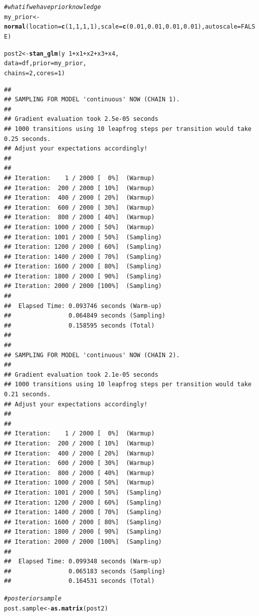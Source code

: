\documentclass[11pt,a4paper,twoside]{book}
\makeatletter
\newcommand{\hlnum}[1]{\textcolor[rgb]{0.686,0.059,0.569}{#1}}%
\newcommand{\hlcom}[1]{\textcolor[rgb]{0.678,0.584,0.686}{\textit{#1}}}%
\newcommand{\hlopt}[1]{\textcolor[rgb]{0,0,0}{#1}}%
\newcommand{\hlstd}[1]{\textcolor[rgb]{0.345,0.345,0.345}{#1}}%
\newcommand{\hlkwb}[1]{\textcolor[rgb]{0.69,0.353,0.396}{#1}}%
\newcommand{\hlkwc}[1]{\textcolor[rgb]{0.333,0.667,0.333}{#1}}%
\newcommand{\hlkwd}[1]{\textcolor[rgb]{0.737,0.353,0.396}{\textbf{#1}}}%
\newenvironment{kframe}{%
 \def\at@end@of@kframe{}%
 \ifinner\ifhmode%
  \def\at@end@of@kframe{\end{minipage}}%
  \begin{minipage}{\columnwidth}%
 \fi\fi%
 \def\FrameCommand##1{\hskip\@totalleftmargin \hskip-\fboxsep
 \colorbox{shadecolor}{##1}\hskip-\fboxsep
     \hskip-\linewidth \hskip-\@totalleftmargin \hskip\columnwidth}%
 \MakeFramed {\advance\hsize-\width
   \@totalleftmargin\z@ \linewidth\hsize
   \@setminipage}}%
 {\par\unskip\endMakeFramed%
 \at@end@of@kframe}
\newenvironment{knitrout}{}{} %
\makeatother
\begin{document}
\begin{knitrout}
\begin{kframe}
\begin{alltt}
\hlcom{#what if we have prior knowledge}
\hlstd{my_prior} \hlkwb{<-} \hlkwd{normal}\hlstd{(}\hlkwc{location} \hlstd{=} \hlkwd{c}\hlstd{(}\hlnum{1}\hlstd{,} \hlnum{1}\hlstd{,}\hlnum{1}\hlstd{,}\hlnum{1}\hlstd{),} \hlkwc{scale} \hlstd{=} \hlkwd{c}\hlstd{(}\hlnum{0.01}\hlstd{,} \hlnum{0.01}\hlstd{,}\hlnum{0.01}\hlstd{,}\hlnum{0.01}\hlstd{),} \hlkwc{autoscale} \hlstd{=} \hlnum{FALSE}\hlstd{)}

\hlstd{post2} \hlkwb{<-} \hlkwd{stan_glm}\hlstd{(y} \hlopt{~} \hlnum{1} \hlopt{+} \hlstd{x1} \hlopt{+} \hlstd{x2} \hlopt{+} \hlstd{x3} \hlopt{+} \hlstd{x4,}
                  \hlkwc{data} \hlstd{= df,} \hlkwc{prior} \hlstd{= my_prior,}
                  \hlkwc{chains} \hlstd{=} \hlnum{2}\hlstd{,} \hlkwc{cores} \hlstd{=} \hlnum{1}\hlstd{)}
\end{alltt}
\begin{verbatim}
## 
## SAMPLING FOR MODEL 'continuous' NOW (CHAIN 1).
## 
## Gradient evaluation took 2.5e-05 seconds
## 1000 transitions using 10 leapfrog steps per transition would take 0.25 seconds.
## Adjust your expectations accordingly!
## 
## 
## Iteration:    1 / 2000 [  0%]  (Warmup)
## Iteration:  200 / 2000 [ 10%]  (Warmup)
## Iteration:  400 / 2000 [ 20%]  (Warmup)
## Iteration:  600 / 2000 [ 30%]  (Warmup)
## Iteration:  800 / 2000 [ 40%]  (Warmup)
## Iteration: 1000 / 2000 [ 50%]  (Warmup)
## Iteration: 1001 / 2000 [ 50%]  (Sampling)
## Iteration: 1200 / 2000 [ 60%]  (Sampling)
## Iteration: 1400 / 2000 [ 70%]  (Sampling)
## Iteration: 1600 / 2000 [ 80%]  (Sampling)
## Iteration: 1800 / 2000 [ 90%]  (Sampling)
## Iteration: 2000 / 2000 [100%]  (Sampling)
## 
##  Elapsed Time: 0.093746 seconds (Warm-up)
##                0.064849 seconds (Sampling)
##                0.158595 seconds (Total)
## 
## 
## SAMPLING FOR MODEL 'continuous' NOW (CHAIN 2).
## 
## Gradient evaluation took 2.1e-05 seconds
## 1000 transitions using 10 leapfrog steps per transition would take 0.21 seconds.
## Adjust your expectations accordingly!
## 
## 
## Iteration:    1 / 2000 [  0%]  (Warmup)
## Iteration:  200 / 2000 [ 10%]  (Warmup)
## Iteration:  400 / 2000 [ 20%]  (Warmup)
## Iteration:  600 / 2000 [ 30%]  (Warmup)
## Iteration:  800 / 2000 [ 40%]  (Warmup)
## Iteration: 1000 / 2000 [ 50%]  (Warmup)
## Iteration: 1001 / 2000 [ 50%]  (Sampling)
## Iteration: 1200 / 2000 [ 60%]  (Sampling)
## Iteration: 1400 / 2000 [ 70%]  (Sampling)
## Iteration: 1600 / 2000 [ 80%]  (Sampling)
## Iteration: 1800 / 2000 [ 90%]  (Sampling)
## Iteration: 2000 / 2000 [100%]  (Sampling)
## 
##  Elapsed Time: 0.099348 seconds (Warm-up)
##                0.065183 seconds (Sampling)
##                0.164531 seconds (Total)
\end{verbatim}
\begin{alltt}
\hlcom{#posterior sample}
\hlstd{post.sample} \hlkwb{<-} \hlkwd{as.matrix}\hlstd{(post2)}


\end{alltt}
\end{kframe}
\end{knitrout}
\end{document}
